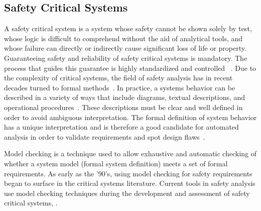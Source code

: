 \subsection{Safety Critical Systems}
\label{sec:SA_background}
A safety critical system is a system whose safety cannot be shown solely by test, whose logic is difficult to comprehend without the aid of analytical tools, and whose failure can directly or indirectly cause significant loss of life or property\cite{SAE:ARP4761}. Guaranteeing safety and reliability of safety critical systems is mandatory. The process that guides this guarantee is highly standardized and controlled~\cite{RTCA:StdC,SAE:ARP4761} . Due to the complexity of critical systems, the field of safety analysis has in recent decades turned to formal methods~\cite{mattarei,Bozzano:2010:DSA:1951720}. In practice, a systems behavior can be described in a variety of ways that include diagrams, textual descriptions, and operational procedures~\cite{SAE:ARP4754A}. These descriptions must be clear and well defined in order to avoid ambiguous interpretation. The formal definition of system behavior has a unique interpretation and is therefore a good candidate for automated analysis in order to validate requirements and spot design flaws~\cite{Joshi05:Dasc}. 

Model checking is a technique used to allow exhaustive and automatic checking of whether a system model (formal system definition) meets a set of formal requirements. As early as the '90's, using model checking for safety requirements began to surface in the critical systems literature\cite{DBLP:conf/safecomp/CimattiGMRTT98,DBLP:conf/edcc/BernardeschiFGM96}. Current tools in safety analysis use model checking techniques during the development and assessment of safety critical systems, \cite{mattarei,CAV2015:BoCiGrMa,symbAltaRica,DBLP:conf/tacas/BittnerBCCGGMMZ16}.






